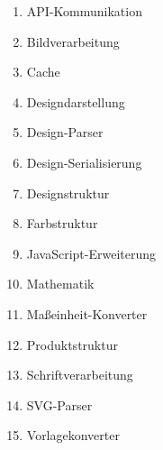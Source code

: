 \begin{enumerate}
    \item API-Kommunikation
    \item Bildverarbeitung
    \item Cache
    \item Designdarstellung
    \item Design-Parser
    \item Design-Serialisierung
    \item Designstruktur
    \item Farbstruktur
    \item JavaScript-Erweiterung
    \item Mathematik
    \item Maßeinheit-Konverter
    \item Produktstruktur
    \item Schriftverarbeitung
    \item SVG-Parser
    \item Vorlagekonverter
\end{enumerate}
